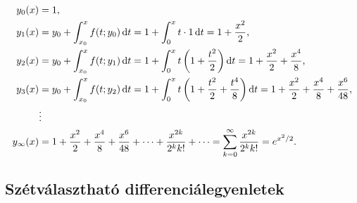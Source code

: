 \documentclass{szb-solution}
\begin{document}
\begin{align*}
  y_0(x)        & = 1 \text,
  \\
  y_1(x)        & = y_0 + \int_{x_0}^x f(t; y_0) \mathop{}\!\mathrm{d} t
  = 1 + \int_0^x t \cdot 1 \mathop{}\!\mathrm{d} t = 1 + \frac{x^2}{2} \text,
  \\
  y_2(x)        & = y_0 + \int_{x_0}^x f(t; y_1) \mathop{}\!\mathrm{d} t
  = 1 + \int_0^x t \left( 1 + \frac{t^2}{2} \right) \mathop{}\!\mathrm{d} t
  = 1 + \frac{x^2}{2} + \frac{x^4}{8} \text,
  \\
  y_3(x)        & = y_0 + \int_{x_0}^x f(t; y_2) \mathop{}\!\mathrm{d} t
  = 1 + \int_0^x t \left( 1 + \frac{t^2}{2} + \frac{t^4}{8} \right) \mathop{}\!\mathrm{d} t
  = 1 + \frac{x^2}{2} + \frac{x^4}{8} + \frac{x^6}{48} \text,
  \\
                & \vdots
  \\
  y_{\infty}(x) & = 1 + \frac{x^2}{2} + \frac{x^4}{8} + \frac{x^6}{48} + \cdots
  + \frac{x^{2k}}{2^k k!} + \cdots
  = \sum_{k=0}^{\infty} \frac{x^{2k}}{2^k k!} = e^{x^2/2} \text.
\end{align*}



\subsection{Szétválasztható differenciálegyenletek}
\end{document}
